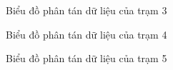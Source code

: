 \documentclass[a4paper]{article}
\begin{document}
\begin{figure}[H]
\caption{Biểu đồ phân tán dữ liệu của trạm 3}
\end{figure}

\begin{figure}[H]
\caption{Biểu đồ phân tán dữ liệu của trạm 4}
\end{figure}

\begin{figure}[H]
\caption{Biểu đồ phân tán dữ liệu của trạm 5}
\end{figure}
\end{document}
